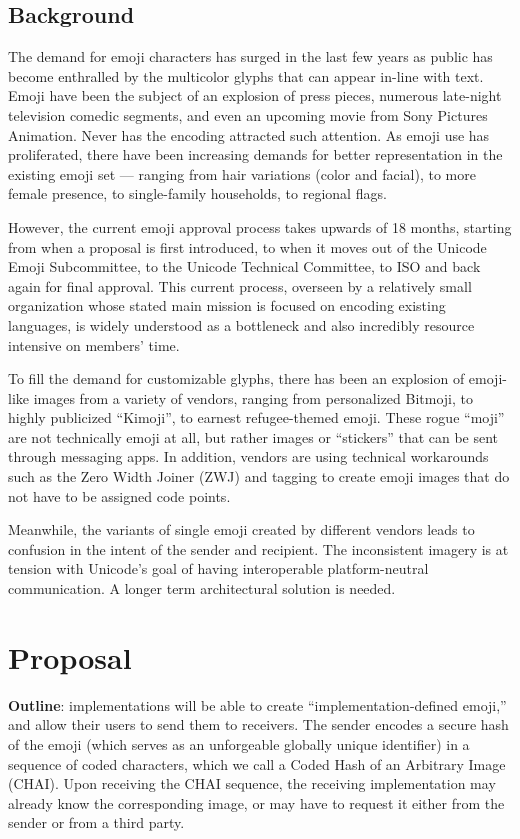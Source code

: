 \documentclass[12pt]{article}
\begin{document}
  \subsection{Background} 

The demand for emoji characters has surged in the last few years as public has become enthralled by the multicolor glyphs that can appear in-line with text. Emoji have been the subject of an explosion of press pieces, numerous late-night television comedic segments, and even an upcoming movie from Sony Pictures Animation. Never has the encoding attracted such attention.
As emoji use has proliferated, there have been increasing demands for better representation in the existing emoji set — ranging from hair variations (color and facial), to more female presence, to single-family households, to regional flags.\autocite{UTR52}

However, the current emoji approval process takes upwards of 18 months, starting from when a proposal is first introduced, to when it moves out of the Unicode Emoji Subcommittee, to the Unicode Technical Committee, to ISO and back again for final approval. This current process, overseen by a relatively small organization whose stated main mission is focused on encoding existing languages, is widely understood as a bottleneck and also incredibly resource intensive on members’ time.

To fill the demand for customizable glyphs, there has been an explosion of emoji-like images from a variety of vendors, ranging from personalized Bitmoji, to highly publicized “Kimoji”, to earnest refugee-themed emoji. These rogue “moji” are not technically emoji at all, but rather images or “stickers” that can be sent through messaging apps. In addition, vendors are using technical workarounds such as the Zero Width Joiner (ZWJ) and tagging to create emoji images that do not have to be assigned code points.

Meanwhile, the variants of single emoji created by different vendors leads to confusion in the intent of the sender and recipient.\autocite{EmojiVarying} The inconsistent imagery is at tension with Unicode’s goal of having interoperable platform-neutral communication. 
A longer term architectural solution is needed. 


\section{Proposal}

\textbf{Outline}: implementations will be able to create
``implementation-defined emoji,'' and allow their users to send them
to receivers. The sender encodes a secure hash of the emoji (which
serves as an unforgeable globally unique identifier) in a sequence of
coded characters, which we call a Coded Hash of an Arbitrary Image
(CHAI). Upon receiving the CHAI sequence, the receiving implementation
may already know the corresponding image, or may have to request it
either from the sender or from a third party.
\end{document}
